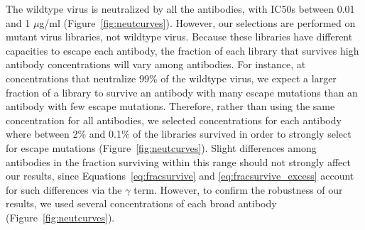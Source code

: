 \documentclass[11pt]{article}
\begin{document}
The wildtype virus is neutralized by all the antibodies, with IC50s between 0.01 and 1 $\mu$g/ml (Figure~\ref{fig:neutcurves}).
However, our selections are performed on mutant virus libraries, not wildtype virus.
Because these libraries have different capacities to escape each antibody, the fraction of each library that survives high antibody concentrations will vary among antibodies.
For instance, at concentrations that neutralize 99\% of the wildtype virus, we expect a larger fraction of a library to survive an antibody with many escape mutations than an antibody with few escape mutations.
Therefore, rather than using the same concentration for all antibodies, we selected concentrations for each antibody where between 2\% and 0.1\% of the libraries survived in order to strongly select for escape mutations (Figure~\ref{fig:neutcurves}).
Slight differences among antibodies in the fraction surviving within this range should not strongly affect our results, since Equations~\ref{eq:fracsurvive} and \ref{eq:fracsurvive_excess} account for such differences via the $\gamma$ term.
However, to confirm the robustness of our results, we used several concentrations of each broad antibody (Figure~\ref{fig:neutcurves}).
\end{document}
